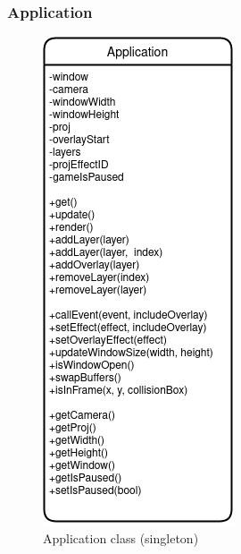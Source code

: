 \documentclass{article}
\begin{document}
            \subsubsection{Application}
                \begin{figure}[hbt!]
                    \centerline{\includegraphics[scale=0.5]{img/Classes/Application.png}}
                    \caption{Application class (singleton)}
                    \label{fig}
                \end{figure}
\end{document}
